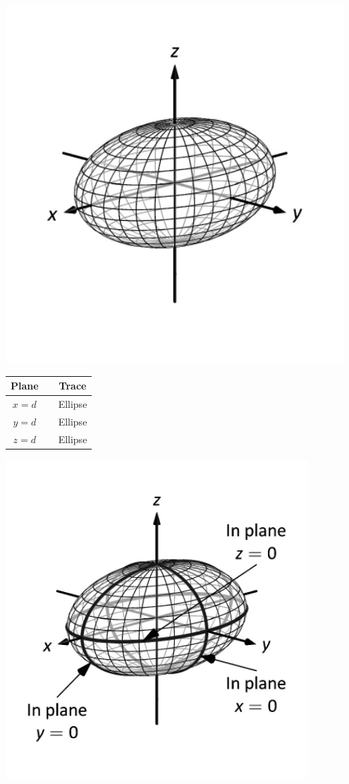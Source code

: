 \begin{minipage}[c]{.3\linewidth}
\vskip0pt
\includegraphics[width=0.95\textwidth]{fig_ana_geo_19a}
\end{minipage}
\begin{minipage}[c]{.25\linewidth}
\vskip0pt\hskip 10pt
\begin{tabular}[]{ccc}
\textbf{Plane}  & & \textbf{Trace} \\ \hline
$x=d$ & & Ellipse \\
$y=d$ & & Ellipse\\
$z=d$ & & Ellipse
\end{tabular}
\end{minipage}%
\begin{minipage}[c]{.45\linewidth}
\includegraphics[width=0.85\textwidth]{fig_ana_geo_19b}
\end{minipage}

